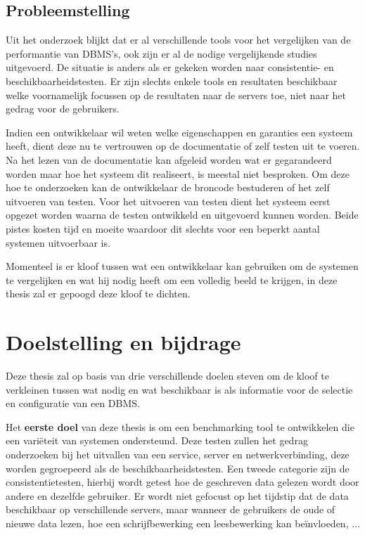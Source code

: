 \subsection{Probleemstelling}
Uit het onderzoek blijkt dat er al verschillende tools voor het vergelijken van de performantie van DBMS's, ook zijn er al de nodige vergelijkende studies uitgevoerd. De situatie is anders als er gekeken worden naar consistentie- en beschikbaarheidstesten. Er zijn slechts enkele tools en resultaten beschikbaar welke voornamelijk focussen op de resultaten naar de servers toe, niet naar het gedrag voor de gebruikers. 

Indien een ontwikkelaar wil weten welke eigenschappen en garanties een systeem heeft, dient deze nu te vertrouwen op de documentatie of zelf testen uit te voeren. Na het lezen van de documentatie kan afgeleid worden wat er gegarandeerd worden maar hoe het systeem dit realiseert, is meestal niet besproken. Om deze hoe te onderzoeken kan de ontwikkelaar de broncode bestuderen of het zelf uitvoeren van testen. Voor het uitvoeren van testen dient het systeem eerst opgezet worden waarna de testen ontwikkeld en uitgevoerd kunnen worden. Beide pistes kosten tijd en moeite waardoor dit slechts voor een beperkt aantal systemen uitvoerbaar is. 

Momenteel is er kloof tussen wat een ontwikkelaar kan gebruiken om de systemen te vergelijken en wat hij nodig heeft om een volledig beeld te krijgen, in deze thesis zal er gepoogd deze kloof te dichten. 

\section{Doelstelling en bijdrage}
Deze thesis zal op basis van drie verschillende doelen steven om de kloof te verkleinen tussen wat nodig en wat beschikbaar is als informatie voor de selectie en configuratie van een DBMS. 

Het \textbf{eerste doel} van deze thesis is om een benchmarking tool te ontwikkelen die een variëteit van systemen ondersteund. Deze testen zullen het gedrag onderzoeken bij het uitvallen van een service, server en netwerkverbinding, deze worden gegroepeerd als de beschikbaarheidstesten. Een tweede categorie zijn de consistentietesten, hierbij wordt getest hoe de geschreven data gelezen wordt door andere en dezelfde gebruiker. Er wordt niet gefocust op het tijdstip dat de data beschikbaar op verschillende servers, maar wanneer de gebruikers de oude of nieuwe data lezen, hoe een schrijfbewerking een leesbewerking kan beïnvloeden, ... \\

